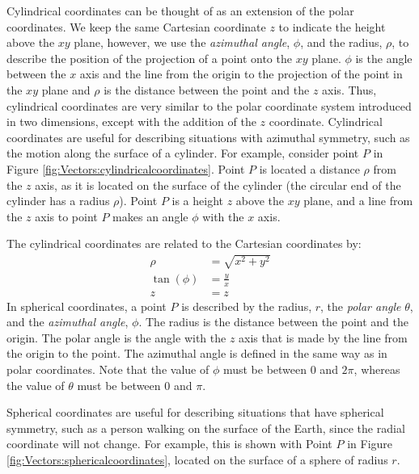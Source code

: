 Cylindrical coordinates can be thought of as an extension of the polar coordinates. We keep the same Cartesian coordinate $z$ to indicate the height above the $xy$ plane, however, we use the \textit{azimuthal angle}, $\phi$, and the radius, $\rho$, to describe the position of the projection of a point onto the $xy$ plane. $\phi$ is the angle between the $x$ axis and the line from the origin to the projection of the point in the $xy$ plane and $\rho$ is the distance between the point and the $z$ axis. Thus, cylindrical coordinates are very similar to the polar coordinate system introduced in two dimensions, except with the addition of the $z$ coordinate. Cylindrical coordinates are useful for describing situations with azimuthal symmetry, such as the motion along the surface of a cylinder. For example, consider point $P$ in Figure \ref{fig:Vectors:cylindricalcoordinates}. Point $P$ is located a distance $\rho$ from the $z$ axis, as it is located on the surface of the cylinder (the circular end of the cylinder has a radius $\rho$). Point $P$ is a height $z$ above the $xy$ plane, and a line from the $z$ axis to point $P$ makes an angle $\phi$ with the $x$ axis.


The cylindrical coordinates are related to the Cartesian coordinates by:
\begin{align*}
\rho &= \sqrt{x^2+y^2}\\
\tan(\phi) &= \frac{y}{x}\\
z&=z
\end{align*}
In spherical coordinates, a point $P$ is described by the radius, $r$, the \textit{polar angle} $\theta$, and the \textit{azimuthal angle}, $\phi$. The radius is the distance between the point and the origin. The polar angle is the angle with the $z$ axis that is made by the line from the origin to the point. The azimuthal angle is defined in the same way as in polar coordinates. Note that the value of $\phi$ must be between $0$ and $2\pi$, whereas the value of $\theta$ must be between $0$ and $\pi$. 

Spherical coordinates are useful for describing situations that have spherical symmetry, such as a person walking on the surface of the Earth, since the radial coordinate will not change. For example, this is shown with Point $P$ in Figure \ref{fig:Vectors:sphericalcoordinates}, located on the surface of a sphere of radius $r$. 

